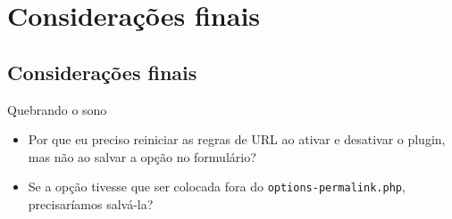 \documentclass{beamer}
\begin{document}
\begin{frame}
  \pause 
  \pause 
  \pause 
  \pause 
  \pause 
\end{frame}

\begin{frame}
  \pause 
  \pause 
  \pause 
\end{frame}

\begin{frame}
  \pause 
  \pause 
  \pause 
  \pause 
\end{frame}

\begin{frame}
  \pause 
  \pause 
  \pause 
\end{frame}

\section{Considerações finais}
\subsection{Considerações finais}

\begin{frame}{Quebrando o sono}
\begin{itemize}
  \pause \item Por que eu preciso reiniciar as regras de URL ao
    ativar e desativar o plugin, mas não ao salvar a opção no formulário?
  \pause \item Se a opção tivesse que ser colocada fora do
    \texttt{options-permalink.php}, precisaríamos salvá-la?
\end{itemize}
\end{frame}
\end{document}
